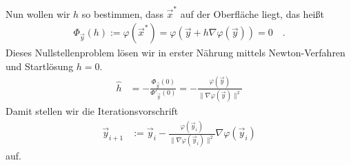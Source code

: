       Nun wollen wir \( h \) so bestimmen, dass \(\vec{x}^{*}\) auf der Oberfläche liegt, das heißt
      \begin{align}
        \Phi_{\vec{y}}(h) := \varphi(\vec{x}^{*}) = \varphi(\vec{y} +  h \nabla\varphi(\vec{y})) = 0 \quad\text{.}
      \end{align}
      Dieses Nullstellenproblem lösen wir in erster Nährung mittels Newton-Verfahren und Startlösung \( h=0 \).
      \begin{align}
        \hat{h} &= - \frac{\Phi_{\vec{y}}(0)}{\Phi'_{\vec{y}}(0)}
                = - \frac{\varphi(\vec{y})}{\|\nabla\varphi(\vec{y})\|^{2}}
      \end{align}
      Damit stellen wir die Iterationsvorschrift
      \begin{align}
        \vec{y}_{i+1} &:= \vec{y}_{i} - \frac{\varphi(\vec{y}_{i})}{\|\nabla\varphi(\vec{y}_{i})\|^{2}}  \nabla\varphi(\vec{y}_{i})
      \end{align}
      auf.


